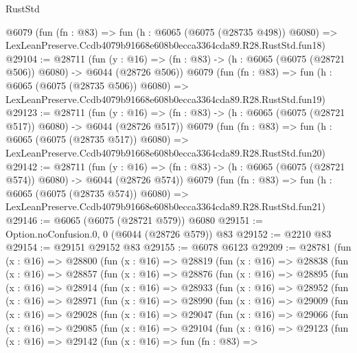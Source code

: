 \begin{lexlean}{RustStd}
\begin{coremodule}
    @6079
    (fun (fn : @83) =>
    fun (h : @6065 (@6075 (@28735 @498)) @6080) =>
    LexLeanPreserve.Ccdb4079b91668e608b0ecca3364cda89.R28.RustStd.fun18)
@29104 := @28711
    (fun (y : @16) => (fn : @83) -> (h : @6065 (@6075 (@28721 @506)) @6080) -> @6044 (@28726 @506))
    @6079
    (fun (fn : @83) =>
    fun (h : @6065 (@6075 (@28735 @506)) @6080) =>
    LexLeanPreserve.Ccdb4079b91668e608b0ecca3364cda89.R28.RustStd.fun19)
@29123 := @28711
    (fun (y : @16) => (fn : @83) -> (h : @6065 (@6075 (@28721 @517)) @6080) -> @6044 (@28726 @517))
    @6079
    (fun (fn : @83) =>
    fun (h : @6065 (@6075 (@28735 @517)) @6080) =>
    LexLeanPreserve.Ccdb4079b91668e608b0ecca3364cda89.R28.RustStd.fun20)
@29142 := @28711
    (fun (y : @16) => (fn : @83) -> (h : @6065 (@6075 (@28721 @574)) @6080) -> @6044 (@28726 @574))
    @6079
    (fun (fn : @83) =>
    fun (h : @6065 (@6075 (@28735 @574)) @6080) =>
    LexLeanPreserve.Ccdb4079b91668e608b0ecca3364cda89.R28.RustStd.fun21)
@29146 := @6065 (@6075 (@28721 @579)) @6080
@29151 := Option.noConfusion.{0, 0} (@6044 (@28726 @579)) @83
@29152 := @2210 @83
@29154 := @29151 @29152 @83
@29155 := @6078 @6123
@29209 := @28781
    (fun (x : @16) =>
    @28800
      (fun (x : @16) =>
      @28819
        (fun (x : @16) =>
        @28838
          (fun (x : @16) =>
          @28857
            (fun (x : @16) =>
            @28876
              (fun (x : @16) =>
              @28895
                (fun (x : @16) =>
                @28914
                  (fun (x : @16) =>
                  @28933
                    (fun (x : @16) =>
                    @28952
                      (fun (x : @16) =>
                      @28971
                        (fun (x : @16) =>
                        @28990
                          (fun (x : @16) =>
                          @29009
                            (fun (x : @16) =>
                            @29028
                              (fun (x : @16) =>
                              @29047
                                (fun (x : @16) =>
                                @29066
                                  (fun (x : @16) =>
                                  @29085
                                    (fun (x : @16) =>
                                    @29104
                                      (fun (x : @16) =>
                                      @29123
                                        (fun (x : @16) =>
                                        @29142
                                          (fun (x : @16) =>
                                          fun (fn : @83) =>

\end{coremodule}
\end{lexlean}
